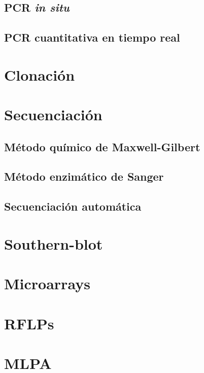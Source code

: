 \subsection{PCR \textit{in situ}}
\subsection{PCR cuantitativa en tiempo real}
\section{Clonación}
\section{Secuenciación}
\subsection{Método químico de Maxwell-Gilbert}
\subsection{Método enzimático de Sanger}
\subsection{Secuenciación automática}
\section{Southern-blot}
\section{Microarrays}
\section{RFLPs}
\section{MLPA}